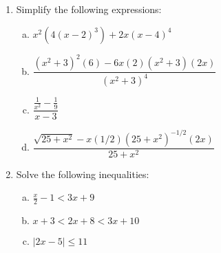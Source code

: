 \documentclass{amsart}
\begin{document}
\begin{enumerate}[1.]
\item Simplify the following expressions:

  \begin{enumerate}[(a)]
  \item
    \(x^2(4(x-2)^3)+2x(x-4)^4\)
    \vspace{2in}
  \item
    $\dfrac{(x^2+3)^2(6)-6x(2)(x^2+3)(2x)}{(x^2+3)^4}$
    \vspace{2in}
  \item
    $\dfrac{\frac{1}{x^2}-\frac{1}{9}}{x-3}$
    \vspace{2in}
  \item
    $\dfrac{\sqrt{25+x^2}-x(1/2)(25+x^2)^{-1/2}(2x)}{25+x^2}$
  \end{enumerate}

  \newpage
  
\item Solve the following inequalities:

  \begin{enumerate}[(a)]
  \item
    $\frac{x}{2}-1<3x+9$
    \vspace{3in}
  \item
    $x+3<2x+8<3x+10$
    \vspace{3in}
  \item
    $\vert 2x-5\vert\leq11$
  \end{enumerate}

\end{enumerate}
\end{document}
